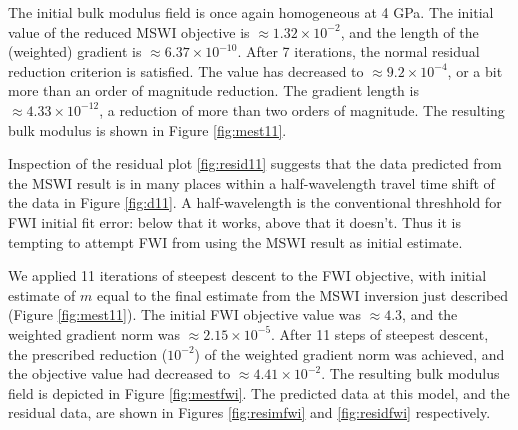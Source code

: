 The initial bulk modulus field is once again homogeneous at 4 GPa. The
initial value of the reduced MSWI objective is $\approx 1.32 \times 10^{-2}$,
and the length of the (weighted) gradient is $\approx 6.37 \times
10^{-10}$. After 7 iterations, the normal residual reduction criterion
is satisfied. The value has decreased to $\approx 9.2 \times 10^{-4}$,
or a bit more than an order of magnitude reduction. The gradient
length is $\approx 4.33 \times 10^{-12}$, a reduction of more than two
orders of magnitude. The resulting bulk modulus is shown in Figure \ref{fig:mest11}.



Inspection of the residual plot \ref{fig:resid11} suggests that the
data predicted from the MSWI result is in many places within a
half-wavelength travel time shift of the data in Figure \ref{fig:d11}.
A half-wavelength is the conventional threshhold for FWI initial fit
error: below that it works, above that it doesn't. Thus it is tempting
to attempt FWI from using the MSWI result as initial estimate.

We applied 11 iterations of steepest descent to the FWI objective,
with initial estimate of $m$ equal to the final estimate from the MSWI
inversion just described (Figure \ref{fig:mest11}). The initial FWI
objective value was $\approx 4.3$, and the weighted gradient norm was
$\approx 2.15 \times 10^{-5}$.  After 11 steps of steepest descent,
the prescribed reduction ($10^{-2}$) of the weighted gradient norm was achieved,
and the objective value had decreased to $\approx 4.41 \times
10^{-2}$. The resulting bulk modulus field is depicted in Figure
\ref{fig:mestfwi}. The predicted data at this model, and the residual
data, are shown in Figures \ref{fig:resimfwi} and \ref{fig:residfwi}
respectively.


